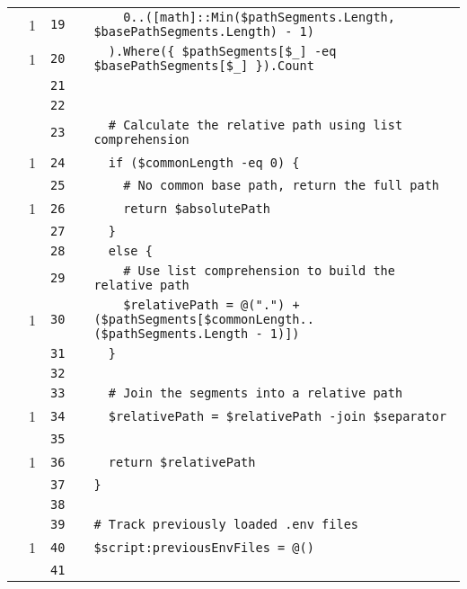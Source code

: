 \documentclass[a4paper,landscape,10pt]{article}
\begin{document}
\begin{longtable}[l]{lrrll}
\cellcolor{green} & 1 & \verb~19~ & & \verb~    0..([math]::Min($pathSegments.Length, $basePathSegments.Length) - 1)~\\
\cellcolor{green} & 1 & \verb~20~ & & \verb~  ).Where({ $pathSegments[$_] -eq $basePathSegments[$_] }).Count~\\
\cellcolor{gray} &  & \verb~21~ & & \verb~~\\
\cellcolor{gray} &  & \verb~22~ & & \verb~~\\
\cellcolor{gray} &  & \verb~23~ & & \verb~  # Calculate the relative path using list comprehension~\\
\cellcolor{green} & 1 & \verb~24~ & & \verb~  if ($commonLength -eq 0) {~\\
\cellcolor{gray} &  & \verb~25~ & & \verb~    # No common base path, return the full path~\\
\cellcolor{green} & 1 & \verb~26~ & & \verb~    return $absolutePath~\\
\cellcolor{gray} &  & \verb~27~ & & \verb~  }~\\
\cellcolor{gray} &  & \verb~28~ & & \verb~  else {~\\
\cellcolor{gray} &  & \verb~29~ & & \verb~    # Use list comprehension to build the relative path~\\
\cellcolor{green} & 1 & \verb~30~ & & \verb~    $relativePath = @(".") + ($pathSegments[$commonLength..($pathSegments.Length - 1)])~\\
\cellcolor{gray} &  & \verb~31~ & & \verb~  }~\\
\cellcolor{gray} &  & \verb~32~ & & \verb~~\\
\cellcolor{gray} &  & \verb~33~ & & \verb~  # Join the segments into a relative path~\\
\cellcolor{green} & 1 & \verb~34~ & & \verb~  $relativePath = $relativePath -join $separator~\\
\cellcolor{gray} &  & \verb~35~ & & \verb~~\\
\cellcolor{green} & 1 & \verb~36~ & & \verb~  return $relativePath~\\
\cellcolor{gray} &  & \verb~37~ & & \verb~}~\\
\cellcolor{gray} &  & \verb~38~ & & \verb~~\\
\cellcolor{gray} &  & \verb~39~ & & \verb~# Track previously loaded .env files~\\
\cellcolor{green} & 1 & \verb~40~ & & \verb~$script:previousEnvFiles = @()~\\
\cellcolor{gray} &  & \verb~41~ & & \verb~~\\

\end{longtable}
\end{document}
